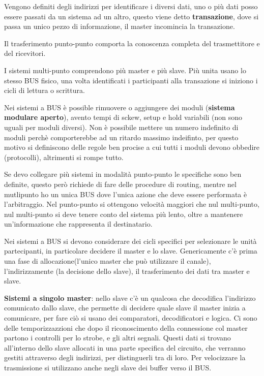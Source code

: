 \documentclass[12pt]{article}
\begin{document}
Vengono definiti degli indirizzi per identificare i diversi dati, uno o pi\`u dati posso essere passati da un sistema ad un altro, questo viene detto \textbf{transazione}, dove si passa un unico pezzo di informazione, il master incomincia la transazione.

Il trasferimento punto-punto comporta la conoscenza completa del trasmettitore e del ricevitori.

I sistemi multi-punto comprendono pi\`u master e pi\`u slave. Pi\`u unita usano lo stesso BUS fisico, una volta identificati i participanti alla transazione si iniziono i cicli di lettura o scrittura.

Nei sistemi a BUS \`e possible rimuovere o aggiungere dei moduli (\textbf{sistema modulare aperto}), avento tempi di sckew, setup e hold variabili (non sono uguali per moduli diversi). Non \`e possibile mettere un numero indefinito di moduli perch\`e comporterebbe ad un ritardo massimo indeifinto, per questo motivo si definiscono delle regole ben procise a cui tutti i moduli devono obbedire (protocolli), altrimenti si rompe tutto.

Se devo collegare pi\`u sistemi in modalit\`a punto-punto le specifiche sono ben definite, questo per\`o richiede di fare delle procedure di routing, mentre nel mutlipunto ho un unica BUS dove l'unica azione che deve essere performata \`e l'arbitraggio. Nel punto-punto si ottengono velocit\`a maggiori che nul multi-punto, nul multi-punto si deve tenere conto del sistema pi\`u lento, oltre a mantenere un'informazione che rappresenta il destinatario.

Nei sistemi a BUS si devono considerare dei cicli specifici per selezionare le unit\`a partecipanti, in particolare decidere il master e lo slave. Genericamente c'\`e prima una fase di allocazione(l'unico master che pu\`o utilizzare il canale), l'indirizzamente (la decisione dello slave), il trasferimento dei dati tra master e slave.

\textbf{Sistemi a singolo master}: nello slave c'\`e un qualcosa che decodifica l'indirizzo comunicato dallo slave, che permette di decidere quale slave il master inizia a comunicare, per fare ci\`o si usano dei comparatori, decodificatori e logica. Ci sono delle temporizzazzioni che dopo il riconoscimento della connessione col master partono i controlli per lo strobe, e gli altri segnali. Questi dati si trovano all'interno dello slave allocati in una parte specifica del circuito, che verranno gestiti attraverso degli indirizzi, per distinguerli tra di loro. Per velocizzare la trasmissione si utilizzano anche negli slave dei buffer verso il BUS.
\end{document}
